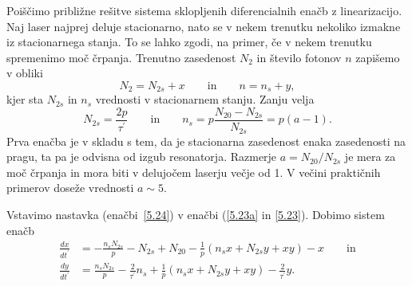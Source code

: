 Poiščimo približne rešitve sistema sklopljenih diferencialnih enačb z 
linearizacijo. Naj laser najprej deluje stacionarno, nato se v nekem trenutku  
nekoliko izmakne iz stacionarnega stanja. To se lahko zgodi, na primer, če v nekem 
trenutku spremenimo moč črpanja. Trenutno zasedenost $N_2$ in število fotonov $n$
zapišemo v obliki 
\begin{equation}  
N_2= N_{2s}+x \qquad \mathrm{in} \qquad n=n_s+y,
\label{5.24}
\end{equation}
kjer sta $N_{2s}$ in $n_s$ vrednosti v stacionarnem stanju. Zanju velja 
\begin{equation}  
N_{2s}=\frac{2p}{\tau^{\prime}}\qquad \mathrm{in}\qquad  
n_s=p\frac{N_{20}-N_{2s}}{N_{2s}}=p(a-1).
\label{5.26}
\end{equation}
Prva enačba je v skladu s tem, da je stacionarna zasedenost 
enaka zasedenosti na pragu, ta pa je odvisna od izgub resonatorja. 
Razmerje $a=N_{20}/N_{2s}$ je mera za moč črpanja in
mora biti v delujočem laserju večje od 1. V večini praktičnih primerov
doseže vrednosti $a \sim 5$.

Vstavimo nastavka (enačbi~\ref{5.24}) v enačbi (\ref{5.23a} in \ref{5.23}). 
Dobimo sistem enačb
\begin{align}  
\frac{d x}{d t^{\prime}} &=-\frac{n_sN_{2s}}{p}-N_{2s}+N_{20}- \frac{1}{p}
(n_sx+N_{2s}y+xy)-x \qquad \mathrm{in}\\
\frac{d y}{d t^{\prime}} &= \frac{n_sN_{2s}}{p}-\frac{2}{\tau^{\prime}}n_s
+ \frac{1}{p}(n_s x+N_{2s} y+xy)-\frac{2}{\tau^{\prime}}y.
\label{5.27}
\end{align}

